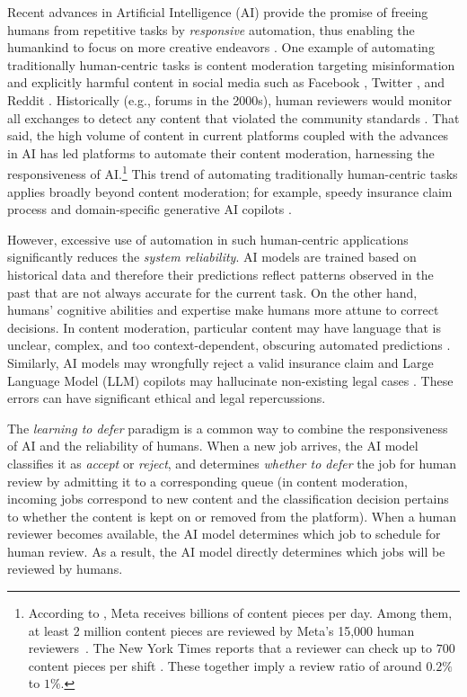 Recent advances in Artificial Intelligence (AI) provide the promise of freeing humans from repetitive tasks by \emph{responsive} automation, thus enabling the humankind to focus on more creative endeavors  \citep{forbesAI}. One example of automating traditionally human-centric tasks is content moderation targeting misinformation and explicitly harmful content in social media such as Facebook \citep{Facebook-standard}, Twitter \citep{X-rule}, and Reddit \citep{reddit-automod}. Historically (e.g., forums in the 2000s), human reviewers would monitor all exchanges to detect any content that violated the community standards \citep{roberts2019behind}. That said, the high volume of content in current platforms coupled with the advances in AI has led platforms to automate their content moderation, harnessing the responsiveness of AI.\footnote{\label{footnote:estimate} 
According to \cite{makhijani2021quest}, Meta receives billions of content pieces per day. Among them, at least 2 million content pieces are reviewed by Meta's 15,000 human reviewers~\citep{Avadhanula2022}. The New York Times reports that a reviewer can check up to $700$ content pieces per shift \citep{Facebook-nyt}. These together imply a review ratio of around $0.2\%$ to $1\%$.} This trend of automating traditionally human-centric tasks applies broadly beyond content moderation; for example, speedy insurance claim process \citep{Pingan} and domain-specific generative AI copilots \citep{Github}.

However, excessive use of automation in such human-centric applications significantly reduces the \emph{system reliability}. AI models are trained based on historical data and therefore their predictions reflect patterns observed in the past that are not always accurate for the current task. 
On the other hand, humans' cognitive abilities and expertise make humans more attune to correct decisions. In content moderation, particular content may have language that is unclear, complex, and too context-dependent, obscuring automated predictions \citep{Facebook-content}. Similarly, AI models may wrongfully reject a valid insurance claim \citep{eubanks2018automating} and Large Language Model (LLM) copilots may hallucinate non-existing legal cases \citep{Lawyer-chatgpt}. These errors can have significant ethical and legal repercussions.

The \emph{learning to defer} paradigm \citep{MadrasCPZ18} is a common way to combine the responsiveness of AI and the reliability of humans. When a new job arrives, the AI model classifies it as \emph{accept} or \emph{reject}, and determines \emph{whether to defer} the job for human review by admitting it to a corresponding queue (in content moderation, incoming jobs correspond to new content and the classification decision pertains to whether the content is kept on or removed from the platform). When a human reviewer becomes available, the AI model determines which job to schedule for human review. As a result, the AI model directly determines which jobs will be reviewed by humans. 

